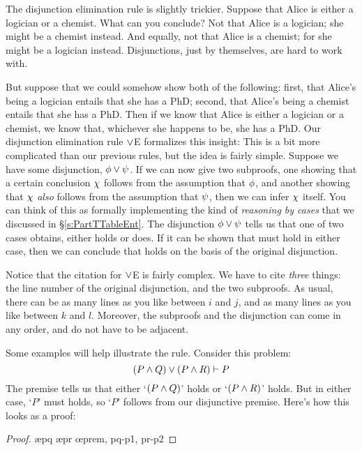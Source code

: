 The disjunction elimination rule is slightly trickier. Suppose that Alice is either a logician or a chemist. What can you conclude? Not that Alice is a logician; she might be a chemist instead. And equally, not that Alice is a chemist; for she might be a logician instead. Disjunctions, just by themselves, are hard to work with.

But suppose that we could somehow show both of the following: first, that Alice's being a logician entails that she has a PhD; second, that Alice's being a chemist entails that she has a PhD. Then if we know that Alice is either a logician or a chemist, we know that, whichever she happens to be, she has a PhD. Our disjunction elimination rule $\vee$E formalizes this insight:
This is a bit more complicated than our previous rules, but the idea is fairly simple. Suppose we have some disjunction, $\mathcal{\phi} \vee \mathcal{\psi}$. If we can now give two subproofs, one showing that a certain conclusion $\mathcal{\chi}$ follows from the assumption that $\mathcal{\phi}$, and another showing that $\mathcal{\chi}$ \emph{also} follows from the assumption that $\mathcal{\psi}$, then we can infer $\mathcal{\chi}$ itself. You can think of this as formally implementing the kind of \emph{reasoning by cases} that we discussed in \S\ref{s:PartTTableEnt}.  The disjunction $\mathcal{\phi} \vee \mathcal{\psi}$ tells us that one of two cases obtains, either \meta{\phi} holds or \meta{\psi} does.  If it can be shown that \meta{\chi} must hold in either case, then we can conclude that \meta{\chi} holds on the basis of the original disjunction.

Notice that the citation for $\vee$E is fairly complex.  We have to cite \emph{three} things: the line number of the original disjunction, and the two subproofs.  As usual, there can be as many lines as you like between $i$ and $j$, and as many lines as you like between $k$ and $l$. Moreover, the subproofs and the disjunction can come in any order, and do not have to be adjacent.

Some examples will help illustrate the rule. Consider this problem:
$$(P \wedge Q) \vee (P \wedge R) \vdash P$$
The premise tells us that either `$(P \wedge Q)$' holds or `$(P \wedge R)$' holds.  But in either case, `$P$' must holds, so `$P$' follows from our disjunctive premise.  Here's how this looks as a proof:
	\begin{proof}
			\open
				 
				\ae{pq}
			\close
			\open
				 
				\ae{pr}
			\close
		\oe{prem, pq-p1, pr-p2}
	\end{proof}

